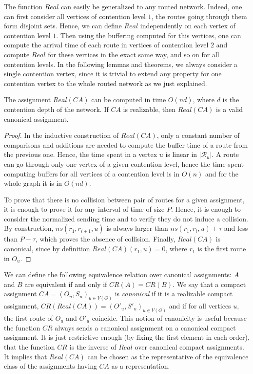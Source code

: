 The function $Real$ can easily be generalized to any routed network. Indeed, one can first consider all vertices of contention level $1$, the routes going through them form disjoint sets. Hence, we can define $Real$ independently on each vertex of contention level $1$. 
Then using the buffering computed for this vertices, one can compute the arrival time of each route in vertices of contention level $2$ and compute $Real$ for these vertices in the exact same way, and so on for all contention levels. In the following lemmas and theorems, we always consider a single contention vertex, since it is trivial to extend any property for one contention vertex to the whole routed network as we just explained. 

\begin{lemma}\label{lemma:canonical}
The assignment $Real(CA)$ can be computed in time $O(nd)$, where $d$ is the contention
depth of the network. If $CA$ is realizable, then $Real(CA)$ is a valid canonical assignment.
\end{lemma}
\begin{proof}
In the inductive construction of $Real(CA)$,  only a constant number of comparisons and additions are needed to compute the 
buffer time of a route from the previous one. Hence, the time spent in a vertex $u$ is linear in $|\mathcal{R}_u|$. 
A route can go through only one vertex of a given contention level, hence the time spent computing buffers for all vertices
of a contention level is in $O(n)$ and for the whole graph it is in $O(nd)$.

To prove that there is no collision between pair of routes for a given assignment, it is enough to 
prove it for any interval of time of size $P$. Hence, it is enough to consider the normalized sending time and to verify
they do not induce a collision. By construction,  $ns(r_1,r_{i+1},u)$ is always larger than $ns(r_1,r_{i},u) + \tau$ and less 
than $P - \tau$, which proves the absence of collision. Finally, $Real(CA)$ is canonical, since by definition $Real(CA)(r_1,u) = 0$,
where $r_1$ is the first route in $O_u$.
\end{proof}

We can define the following equivalence relation over canonical assignments: $A$ and $B$ are equivalent if and only if $CR(A) = CR(B)$.
We say that a compact assignment $CA = (O_u,S_u)_{u \in V(G)}$ is \emph{canonical} if it is a realizable compact assignment, $CR(Real(CA)) = (O'_u,S'_u)_{u \in V(G)}$ and if for all vertices $u$, the first route of $O_u$ and $O'_u$ coincide. This notion of canonicity is useful because the function 
$CR$ always sends a canonical assignment on a canonical compact assignment. It is just restrictive enough (by fixing the first element in each order),
that the function $CR$ is the inverse of $Real$ over canonical compact assignments. It implies that
$Real(CA)$ can be chosen as the representative of the equivalence class of the assignments having $CA$ as a representation.

